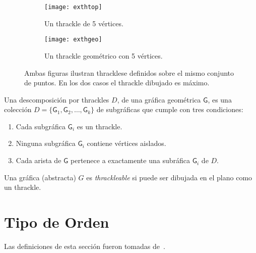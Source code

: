 \begin{figure}[htb]
  \centering
\begin{subfigure}[h]{.4\textwidth}
  \centering
  \texttt{[image: exthtop]}
  \caption{Un thrackle de 5 vértices.}
  \label{fig:exthtop}
\end{subfigure}\hfill%
\begin{subfigure}[h]{.4\textwidth}
  \centering
  \texttt{[image: exthgeo]}
  \caption{Un thrackle geométrico con 5 vértices.}
  \label{fig:exthgeo}
\end{subfigure}
\caption{Ambas figuras ilustran thracklese definidos sobre el mismo conjunto de
puntos. En los dos casos el thrackle dibujado es máximo.}
\label{fig:exthgeotop}
\end{figure}

Una descomposición por thrackles $D$, de una gráfica geométrica
$\mathsf{G}$, es una colección $D=\{\mathsf{G}_1,\mathsf{G}_2,\dots,\mathsf{G}_k\}$
de subgráficas que cumple con tres condiciones:
\begin{enumerate}
  \item Cada subgráfica $\mathsf{G}_i$ es un thrackle.
  \item Ninguna subgráfica $\mathsf{G}_i$ contiene vértices aislados.
  \item Cada arista de $\mathsf{G}$ pertenece a exactamente una subráfica $\mathsf{G}_i$ de $D$.
\end{enumerate}

Una gráfica (abstracta) $G$ es \emph{thrackleable} si puede ser dibujada en el plano como un thrackle.
\section{Tipo de Orden}
Las definiciones de esta sección fueron tomadas de~\cite{Aichholzer2002}.

